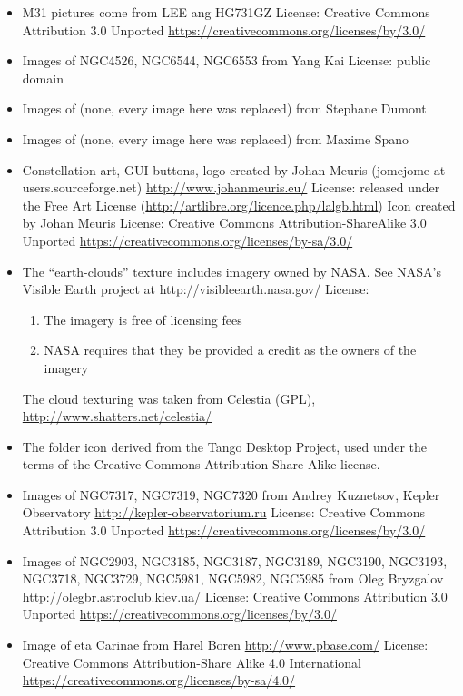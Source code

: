 \begin{itemize}
	 \url{https://www.nasa.gov/nasa-brand-center/images-and-media/}
\item M31 pictures come from LEE ang HG731GZ
	 License: Creative Commons Attribution 3.0 Unported \url{https://creativecommons.org/licenses/by/3.0/}
\item Images of NGC4526, NGC6544, NGC6553
	 from Yang Kai
	 License: public domain 
\item Images of (none, every image here was replaced) from Stephane
	 Dumont
\item Images of (none, every image here was replaced) from Maxime Spano
\item Constellation art, GUI buttons, logo created by Johan Meuris
	 (jomejome at users.sourceforge.net)
	 \url{http://www.johanmeuris.eu/}
	 License: released under the Free Art License
	 (\url{http://artlibre.org/licence.php/lalgb.html})
	 Icon created by Johan Meuris
	 License: Creative Commons Attribution-ShareAlike 3.0 Unported \url{https://creativecommons.org/licenses/by-sa/3.0/}
\item The ``earth-clouds'' texture includes imagery owned by NASA.
	 See NASA's Visible Earth project at http://visibleearth.nasa.gov/
	 License: \begin{enumerate}
	 		\item The imagery is free of licensing fees
			\item NASA requires that they be provided a credit as the 
		 			owners of the imagery
		 \end{enumerate}
	 The cloud texturing was taken from Celestia (GPL),
	 \url{http://www.shatters.net/celestia/}
\item The folder icon derived from the Tango Desktop Project, used under
	 the terms of the Creative Commons Attribution Share-Alike
	 license.
\item Images of NGC7317, NGC7319, NGC7320
	 from Andrey Kuznetsov, Kepler Observatory
	 \url{http://kepler-observatorium.ru}
	 License: Creative Commons Attribution 3.0 Unported \url{https://creativecommons.org/licenses/by/3.0/}
\item Images of NGC2903, NGC3185, NGC3187, NGC3189,
	 NGC3190, NGC3193, NGC3718, NGC3729, NGC5981, NGC5982,
	 NGC5985
	 from Oleg Bryzgalov 
	 \url{http://olegbr.astroclub.kiev.ua/}
	 License: Creative Commons Attribution 3.0 Unported \url{https://creativecommons.org/licenses/by/3.0/}
\item Image of eta Carinae 
	 from Harel Boren
	 \url{http://www.pbase.com/}
	 License: Creative Commons Attribution-Share Alike 4.0 International \url{https://creativecommons.org/licenses/by-sa/4.0/}

\end{itemize}
